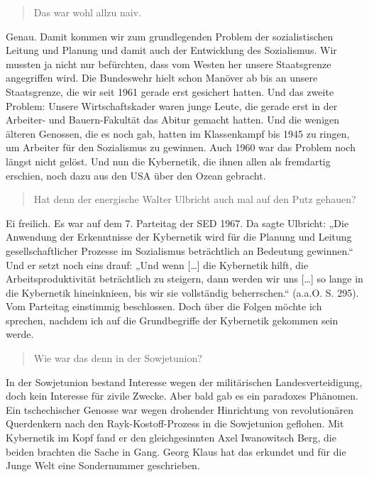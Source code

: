 \documentclass[11pt,a4paper]{article}
\newenvironment{frage}{\begin{quote}}{\end{quote}}
\begin{document}
\begin{frage}
  Das war wohl allzu naiv.
\end{frage}
Genau. Damit kommen wir zum grundlegenden Problem der sozialistischen Leitung
und Planung und damit auch der Entwicklung des Sozialismus. Wir mussten ja
nicht nur befürchten, dass vom Westen her unsere Staatsgrenze angegriffen
wird. Die Bundeswehr hielt schon Manöver ab bis an unsere Staatsgrenze, die
wir seit 1961 gerade erst gesichert hatten. Und das zweite Problem: Unsere
Wirtschaftskader waren junge Leute, die gerade erst in der Arbeiter- und
Bauern-Fakultät das Abitur gemacht hatten. Und die wenigen älteren Genossen,
die es noch gab, hatten im Klassenkampf bis 1945 zu ringen, um Arbeiter für
den Sozialismus zu gewinnen. Auch 1960 war das Problem noch längst nicht
gelöst. Und nun die Kybernetik, die ihnen allen als fremdartig erschien, noch
dazu aus den USA über den Ozean gebracht.

\begin{frage}
  Hat denn der energische Walter Ulbricht auch mal auf den Putz gehauen? 
\end{frage}
Ei freilich. Es war auf dem 7. Parteitag der SED 1967. Da sagte Ulbricht: „Die
Anwendung der Erkenntnisse der Kybernetik wird für die Planung und Leitung
gesellschaftlicher Prozesse im Sozialismus beträchtlich an Bedeutung
gewinnen.“ Und er setzt noch eins drauf: „Und wenn [\ldots] die Kybernetik
hilft, die Arbeitsproduktivität beträchtlich zu steigern, dann werden wir uns
[\ldots] so lange in die Kybernetik hineinknieen, bis wir sie vollständig
beherrschen.“ (a.a.O. S. 295). Vom Parteitag einstimmig beschlossen. Doch über
die Folgen möchte ich sprechen, nachdem ich auf die Grundbegriffe der
Kybernetik gekommen sein werde.

\begin{frage}
  Wie war das denn in der Sowjetunion? 
\end{frage}
In der Sowjetunion bestand Interesse wegen der militärischen
Landesverteidigung, doch kein Interesse für zivile Zwecke. Aber bald gab es
ein paradoxes Phänomen. Ein tschechischer Genosse war wegen drohender
Hinrichtung von revolutionären Querdenkern nach den Rayk-Kostoff-Prozess in
die Sowjetunion geflohen. Mit Kybernetik im Kopf fand er den gleichgesinnten
Axel Iwanowitsch Berg, die beiden brachten die Sache in Gang. Georg Klaus hat
das erkundet und für die Junge Welt eine Sondernummer geschrieben.
\end{document}

